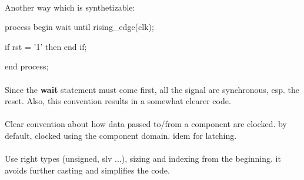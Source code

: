 \documentclass[12pt]{article}
\begin{document}
\paragraph{}
Another way which is synthetizable:
\begin{vhdl}
process
begin
 wait until rising_edge(clk);

 if rst = '1' then
 end if;

end process;
\end{vhdl}

\paragraph{}
Since the \textbf{wait} statement must come first, all the signal
are synchronous, esp. the reset. Also, this convention results in
a somewhat clearer code.



\paragraph{}
Clear convention about how data passed to/from a component are
clocked. by default, clocked using the component domain. idem for
latching.



\paragraph{}
Use right types (unsigned, slv ...), sizing and indexing from the
beginning. it avoids further casting and simplifies the code.
\end{document}
